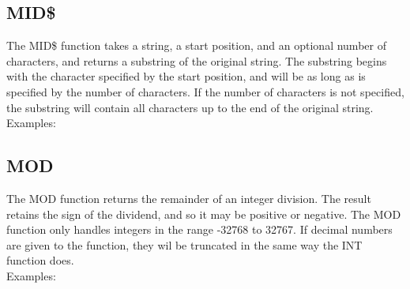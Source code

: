 \subsection{MID\$}

The {\ttfamily MID\$} function takes a string, a start position, and an
optional number of characters, and returns a substring of the original string.
The substring begins with the character specified by the start position, and
will be as long as is specified by the number of characters.  If the number of
characters is not specified, the substring will contain all characters up to
the end of the original string.\\

Examples:\\


\subsection{MOD}

The {\ttfamily MOD} function returns the remainder of an integer division.
The result retains the sign of the dividend, and so it may be positive or
negative. The {\ttfamily MOD} function only handles integers in the range
-32768 to 32767. If decimal numbers are given to the function, they wil be
truncated in the same way the {\ttfamily INT} function does.\\

Examples:\\


